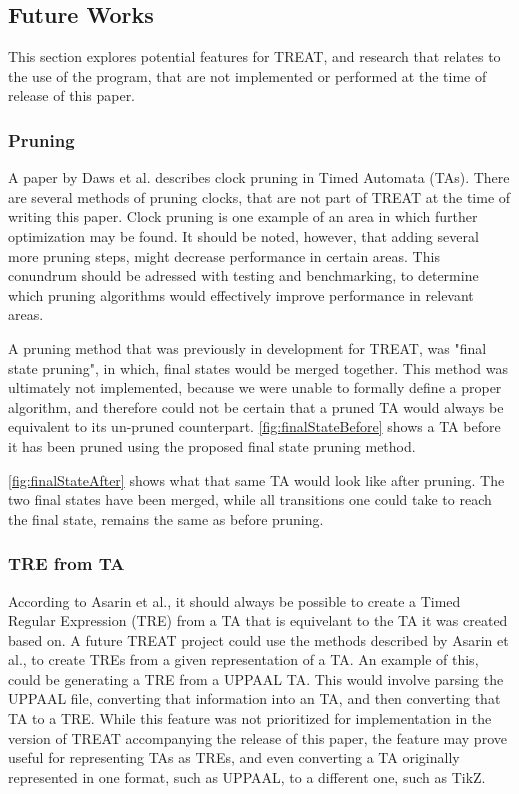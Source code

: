 \subsection{Future Works}\label{subsec:futureWorks}
This section explores potential features for TREAT, and research that relates to the use of the program, that are not implemented or performed at the time of release of this paper.

\subsubsection{Pruning}\label{futureWorks:pruning}
A paper by Daws et al. \cite{Daws1996} describes clock pruning in Timed Automata (TAs). There are several methods of pruning clocks, that are not part of TREAT at the time of writing this paper.
Clock pruning is one example of an area in which further optimization may be found. It should be noted, however, that adding several more pruning steps, might decrease performance in certain areas.
This conundrum should be adressed with testing and benchmarking, to determine which pruning algorithms would effectively improve performance in relevant areas.

\vspace{.5\baselineskip plus 2pt}
A pruning method that was previously in development for TREAT, was "final state pruning", in which, final states would be merged together. This method was ultimately not implemented, because we were unable to formally define a proper algorithm, and therefore could not be certain that a pruned TA would always be equivalent to its un-pruned counterpart.
\cref{fig:finalStateBefore} shows a TA before it has been pruned using the proposed final state pruning method.

\vspace{0.75em}

\cref{fig:finalStateAfter} shows what that same TA would look like after pruning. The two final states have been merged, while all transitions one could take to reach the final state, remains the same as before pruning.



\vspace{-2.6em}

\subsubsection{TRE from TA}
According to Asarin et al.\cite{Eugene2001}, it should always be possible to create a Timed Regular Expression (TRE) from a TA that is equivelant to the TA it was created based on.
A future TREAT project could use the methods described by Asarin et al., to create TREs from a given representation of a TA. An example of this, could be generating a TRE from a UPPAAL TA.
This would involve parsing the UPPAAL file, converting that information into an TA, and then converting that TA to a TRE.
While this feature was not prioritized for implementation in the version of TREAT accompanying the release of this paper, the feature may prove useful for representing TAs as TREs, and even converting a TA originally represented in one format, such as UPPAAL, to a different one, such as TikZ.

